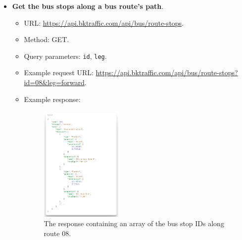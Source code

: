 \begin{itemize}
    \item \textbf{Get the bus stops along a bus route's path}.
    \begin{itemize}
        \item URL: \url{https://api.bktraffic.com/api/bus/route-stops}.
        \item Method: GET.
        \item Query parameters: \lstinline{id}, \lstinline{leg}.
        \item Example request URL: \url{https://api.bktraffic.com/api/bus/route-stops?id=08&leg=forward}.
        \item Example response:
        \begin{figure}[H]
            \centering
            \includegraphics[width=0.4\textwidth]{assets/images/Implementation/route_stops_response.png}
            \caption{The response containing an array of the bus stop IDs along route 08.}
            \label{fig:route_stops_response}
        \end{figure}
    \end{itemize}


\end{itemize}
